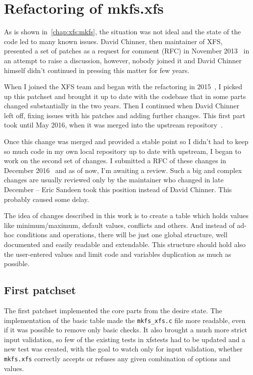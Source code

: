 \chapter{Refactoring of mkfs.xfs} \label{chap:refactoring}
As is shown in~\ref{chap:xfs:mkfs}, the situation was not ideal and the state of the code led to many known issues. David Chinner, then maintainer of XFS, presented a set of patches as a request for comment (RFC) in November 2013~\cite{davidsPatches} in an attempt to raise a discussion, however, nobody joined it and David Chinner himself didn't continued in pressing this matter for few years.

When I joined the XFS team and began with the refactoring in 2015~\cite{myFirstPatches}, I picked up this patchset and brought it up to date with the codebase that in some parts changed substantially in the two years. Then I continued when David Chinner left off, fixing issues with his patches and adding further changes. This first part took until May 2016, when it was merged into the upstream repository~\cite{finalPatchset1,finalPatchset1Announce}.

Once this change was merged and provided a stable point so I didn't had to keep so much code in my own local repository up to date with upstream, I began to work on the second set of changes. I submitted a RFC of these changes in December 2016~\cite{secondSetRFC} and as of now, I'm awaiting a review. Such a big and complex changes are usually reviewed only by the maintainer who changed in late December -- Eric Sandeen took this position instead of David Chinner. This probably caused some delay.

The idea of changes described in this work is to create a table which holds values like minimum/maximum, default values, conflicts and others. And instead of ad-hoc conditions and operations, there will be just one global structure, well documented and easily readable and extendable. This structure should hold also the user-entered values and limit code and variables duplication as much as possible.

\section{First patchset}\label{chap:refactoring:first}
The first patchset implemented the core parts from the desire state. The implementation of the basic table made the {\tt mkfs\_xfs.c} file more readable, even if it was possible to remove only basic checks. It also brought a much more strict input validation, so few of the existing tests in xfstests had to be updated and a new test was created, with the goal to watch only for input validation, whether {\tt mkfs.xfs} correctly accepts or refuses any given combination of options and values.

